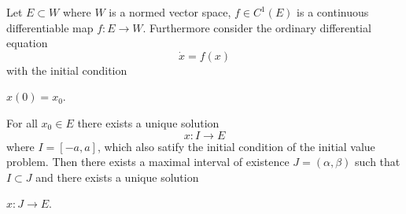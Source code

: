 \documentclass[12pt]{article}
\begin{document}
Let $E\subset W$ where $W$ is a normed vector space, $f\in C^1(E)$ is a continuous differentiable map $f: E \to W$.  Furthermore consider the ordinary differential equation
$$\dot{x} = f(x)$$
with the initial condition
\begin{center}
$x(0) = x_0$.
\end{center}
For all $x_0 \in E$ there exists a unique solution
$$x:I \to E$$
where $I = [-a,a]$, which also satify the initial condition of the initial value problem.  Then there exists a maximal interval of existence $J=( \alpha ,\beta )$ such that $I\subset J$ and there exists a unique solution   
\begin{center}
$x:J \to E$.
\end{center}
\end{document}
